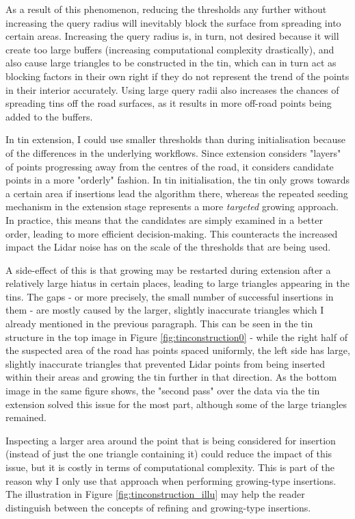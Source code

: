 As a result of this phenomenon, reducing the thresholds any further without increasing the query radius will inevitably block the surface from spreading into certain areas. Increasing the query radius is, in turn, not desired because it will create too large buffers (increasing computational complexity drastically), and also cause large triangles to be constructed in the \ac{tin}, which can in turn act as blocking factors in their own right if they do not represent the trend of the points in their interior accurately. Using large query radii also increases the chances of spreading \ac{tin}s off the road surfaces, as it results in more off-road points being added to the buffers.

In \ac{tin} extension, I could use smaller thresholds than during initialisation because of the differences in the underlying workflows. Since extension considers "layers" of points progressing away from the centres of the road, it considers candidate points in a more "orderly" fashion. In \ac{tin} initialisation, the \ac{tin} only grows towards a certain area if insertions lead the algorithm there, whereas the repeated seeding mechanism in the extension stage represents a more \textit{targeted} growing approach. In practice, this means that the candidates are simply examined in a better order, leading to more efficient decision-making. This counteracts the increased impact the Lidar noise has on the scale of the thresholds that are being used.

A side-effect of this is that growing may be restarted during extension after a relatively large hiatus in certain places, leading to large triangles appearing in the \ac{tin}s. The gaps - or more precisely, the small number of successful insertions in them - are mostly caused by the larger, slightly inaccurate triangles which I already mentioned in the previous paragraph. This can be seen in the \ac{tin} structure in the top image in Figure \ref{fig:tinconstruction0} - while the right half of the suspected area of the road has points spaced uniformly, the left side has large, slightly inaccurate triangles that prevented Lidar points from being inserted within their areas and growing the \ac{tin} further in that direction. As the bottom image in the same figure shows, the "second pass" over the data via the \ac{tin} extension solved this issue for the most part, although some of the large triangles remained.

Inspecting a larger area around the point that is being considered for insertion (instead of just the one triangle containing it) could reduce the impact of this issue, but it is costly in terms of computational complexity. This is part of the reason why I only use that approach when performing growing-type insertions. The illustration in Figure \ref{fig:tinconstruction_illu} may help the reader distinguish between the concepts of refining and growing-type insertions.

